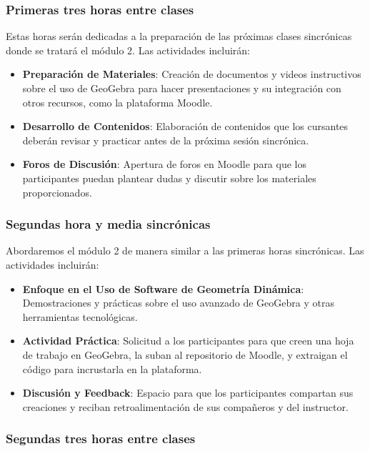\subsubsection{Primeras tres horas entre clases}

Estas horas serán dedicadas a la preparación de las próximas clases sincrónicas donde se tratará el módulo 2. Las actividades incluirán:

\begin{itemize}
	\item \textbf{Preparación de Materiales}: Creación de documentos y videos instructivos sobre el uso de GeoGebra para hacer presentaciones y su integración con otros recursos, como la plataforma Moodle.
	\item \textbf{Desarrollo de Contenidos}: Elaboración de contenidos que los cursantes deberán revisar y practicar antes de la próxima sesión sincrónica.
	\item \textbf{Foros de Discusión}: Apertura de foros en Moodle para que los participantes puedan plantear dudas y discutir sobre los materiales proporcionados.
\end{itemize}

\subsubsection{Segundas hora y media sincrónicas}

Abordaremos el módulo 2 de manera similar a las primeras horas sincrónicas. Las actividades incluirán:

\begin{itemize}
	\item \textbf{Enfoque en el Uso de Software de Geometría Dinámica}: Demostraciones y prácticas sobre el uso avanzado de GeoGebra y otras herramientas tecnológicas.
	\item \textbf{Actividad Práctica}: Solicitud a los participantes para que creen una hoja de trabajo en GeoGebra, la suban al repositorio de Moodle, y extraigan el código para incrustarla en la plataforma.
	\item \textbf{Discusión y Feedback}: Espacio para que los participantes compartan sus creaciones y reciban retroalimentación de sus compañeros y del instructor.
\end{itemize}

\subsubsection{Segundas tres horas entre clases}

